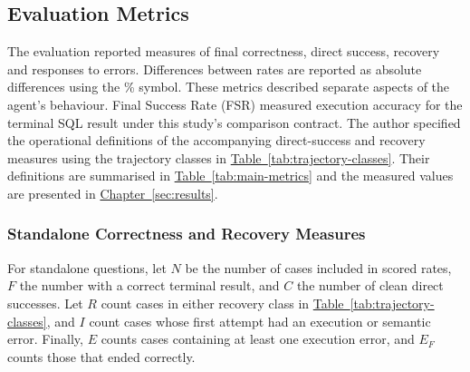\subsection{Evaluation Metrics}
\label{sec:metrics}

The evaluation reported measures of final correctness, direct success,
recovery and responses to errors. 
Differences between rates are reported as absolute differences using the \% symbol.
These metrics described separate aspects of the agent's behaviour. 
Final Success Rate (FSR) measured execution accuracy \citep{yu2018spider}
for the terminal SQL result under this study's comparison contract.
The author specified the operational definitions of the accompanying direct-success and recovery measures
using the trajectory classes in \hyperref[tab:trajectory-classes]{Table~\ref*{tab:trajectory-classes}}.
Their definitions are summarised in \hyperref[tab:main-metrics]{Table~\ref*{tab:main-metrics}} and
the measured values are presented in \hyperref[sec:results]{Chapter~\ref*{sec:results}}.

\subsubsection{Standalone Correctness and Recovery Measures}

For standalone questions, let $N$ be the number of cases included in scored
rates, $F$ the number with a correct terminal result, and $C$ the number of clean
direct successes. Let $R$ count cases in either recovery class in
\hyperref[tab:trajectory-classes]{Table~\ref*{tab:trajectory-classes}}, and $I$ count cases whose first attempt had
an execution or semantic error. Finally, $E$ counts cases containing at least
one execution error, and $E_F$ counts those that ended correctly.

